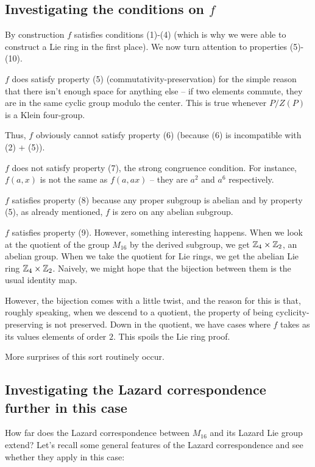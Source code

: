 \documentclass[10pt]{amsart}
\begin{document}
\subsection{Investigating the conditions on $f$}

By construction $f$ satisfies conditions (1)-(4) (which is why we were
able to construct a Lie ring in the first place). We now turn
attention to properties (5)-(10).

$f$ does satisfy property (5) (commutativity-preservation) for the
simple reason that there isn't enough space for anything else -- if
two elements commute, they are in the same cyclic group modulo the
center. This is true whenever $P/Z(P)$ is a Klein four-group.

Thus, $f$ obviously cannot satisfy property (6) (because (6) is
incompatible with (2) + (5)).

$f$ does not satisfy property (7), the strong congruence
condition. For instance, $f(a,x)$ is not the same as $f(a,ax)$ -- they
are $a^2$ and $a^6$ respectively.

$f$ satisfies property (8) because any proper subgroup is abelian and
by property (5), as already mentioned, $f$ is zero on any abelian
subgroup.

$f$ satisfies property (9). However, something interesting
happens. When we look at the quotient of the group $M_{16}$ by the
derived subgroup, we get $\mathbb{Z}_4 \times \mathbb{Z}_2$, an abelian group. When we
take the quotient for Lie rings, we get the abelian Lie ring $\mathbb{Z}_4
\times \mathbb{Z}_2$. Naively, we might hope that the bijection between them
is the usual identity map.

However, the bijection comes with a little twist, and the reason for
this is that, roughly speaking, when we descend to a quotient, the
property of being cyclicity-preserving is not preserved. Down in the
quotient, we have cases where $f$ takes as its values elements of
order $2$. This spoils the Lie ring proof.

More surprises of this sort routinely occur.

\subsection{Investigating the Lazard correspondence further in this case}

How far does the Lazard correspondence between $M_{16}$ and its Lazard
Lie group extend? Let's recall some general features of the Lazard
correspondence and see whether they apply in this case:
\end{document}
